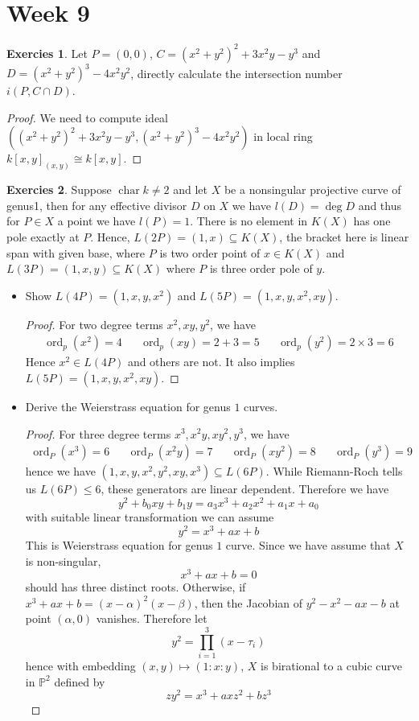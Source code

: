 \documentclass[12pt,a4paper]{article}
\theoremstyle{definition}
\newtheorem{exer}{Exercies}[section]
\DeclareMathOperator{\Char}{char}
\DeclareMathOperator{\ord}{ord}
\begin{document}
\section{Week 9}
\begin{exer}
	Let $P=(0,0)$, $C = (x^2+y^2)^2 + 3x^2y -y^3$ and $D = (x^2+y^2)^3 -4x^2y^2$, directly calculate the intersection number $i(P, C\cap D)$.
\end{exer}
\begin{proof}
	We need to compute ideal $((x^2+y^2)^2+3x^2y-y^3, (x^2+y^2)
^3 -4x^2y^2)$ in local ring $k[x,y]_{(x,y)} \cong k[x,y]$.
\end{proof}
\begin{exer}
	Suppose $\Char k \neq 2$ and let $X$ be a nonsingular projective curve of genus1, then for any effective divisor $D$ on $X$ we have $l(D) = \deg D$ and thus for $P \in X$ a point we have $l(P)=1$. There is no element in $K(X)$ has one pole exactly at $P$. Hence, $L(2P)=(1,x) \subseteq K(X)$, the bracket here is linear span with given base, where $P$ is two order point of $x \in K(X)$ and $L(3P) = (1,x,y) \subseteq K(X)$ where $P$ is three order pole of $y$.
	\begin{itemize}
		\item Show $L(4P)= (1,x,y,x^2)$ and $L(5P)= (1,x,y,x^2,xy)$.
		\begin{proof}
			For two degree terms $x^2, xy, y^2$, we have\[
			\begin{aligned}
			\ord_p(x^2)= 4& &\ord_p(xy) = 2+ 3 =5 & &\ord_p(y^2)= 2\times 3=6
			\end{aligned}
			\]
			Hence $x^2 \in L(4P)$ and others are not.
			It also implies $L(5P) = (1,x,y,x^2,xy)$.
		\end{proof}
	\item Derive the Weierstrass equation for genus $1$ curves.
	\begin{proof}
		For three degree terms $x^3,x^2y,xy^2,y^3$, we have \[
		\begin{aligned}
		\ord_P(x^3) =6 & & \ord_P(x^2y)= 7 & & \ord_P(xy^2)=8 & &\ord_P(y^3)=9
		\end{aligned}
		\] hence we have $(1,x,y,x^2,y^2,xy, x^3) \subseteq L(6P)$. While Riemann-Roch tells us $L(6P) \leq 6$, these generators are linear dependent. Therefore we have
		\[
		y^2+b_0xy + b_1 y = a_3 x^3 + a_2 x^2 + a_1 x + a_0
		\]
		with suitable linear transformation we can assume
		\[
		y^2= x^3 +a x +b
		\]
		This is Weierstrass equation for genus $1$ curve.
		Since we have assume that $X$ is non-singular, 
		\[
		x^3+ax+b =0
		\]
		should has three distinct roots. Otherwise, if $x^3+ax+b = (x-\alpha)^2(x-\beta)$, then the Jacobian of $y^2-x^2-ax-b$ at point $(\alpha,0)$ vanishes. Therefore let
		\[
		y^2 = \prod_{i=1}^3(x-\tau_i)
		\]
		hence with embedding $(x,y) \mapsto (1:x:y)$, $X$ is birational to a cubic curve in $\mathbb{P}^2$ defined by
		\[
		zy^2= x^3+axz^2+bz^3
		\]
	\end{proof}
	\end{itemize}
\end{exer}
\end{document}
